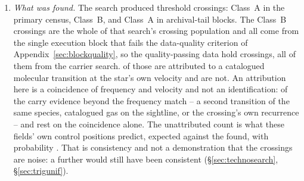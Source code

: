 \begin{enumerate}[leftmargin=1.6em,itemsep=4pt,topsep=4pt,parsep=0pt]
\item \emph{What was found.} The search produced \EvNCrossRaw{} threshold
crossings: \CkNCrossCenA{} Class~A in the primary census, \PrFlagXrossWord{}
Class~B, and \CeNTailCrossWord{} Class~A in archival-tail blocks. The
\PrFlagXrossWord{} Class~B crossings are the whole of that search's crossing
population and all come from the single execution block that fails the
data-quality criterion of Appendix~\ref{sec:blockquality}, so the
quality-passing data hold \EvNCrossQp{} crossings, all of them from the
carrier search. \EvNAttrQp{} of those are attributed to
a catalogued molecular transition at the star's own velocity and
\EvNUnattrQp{} are not.
An attribution here is a coincidence of frequency and velocity and not an
identification: \LnAttrSupp{} of the \EvNAttrQp{} carry evidence beyond the
frequency match -- a second transition of the same species, catalogued gas
on the sightline, or the crossing's own recurrence -- and
\LnAttrCoincWord{} rest on the coincidence alone. The unattributed count is
what these fields' own control positions predict, \CeExp{} expected against
the \CeObs{} found, with probability \CeProbNull. That is consistency and
not a demonstration that the crossings are noise: a further \CeAddLim{}
would still have been consistent
(\S\ref{sec:technosearch}, \S\ref{sec:trigunif}).


\end{enumerate}
